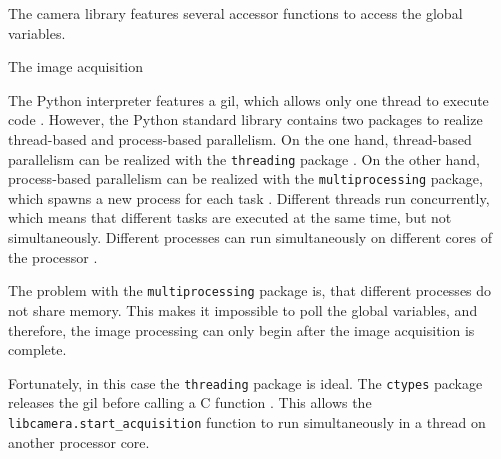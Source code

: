 The camera library features several accessor functions to access the global variables.



The image acquisition 


The Python interpreter features a \acrfull{gil}, which allows only one thread to execute code \cite{}. %
However, the Python standard library contains two packages to realize thread-based and process-based parallelism.
On the one hand, thread-based parallelism can be realized with the \texttt{threading} package \cite{}. %
On the other hand, process-based parallelism can be realized with the \texttt{multiprocessing} package, which spawns a new process for each task \cite{}. %
Different threads run concurrently, which means that different tasks are executed at the same time, but not simultaneously.
Different processes can run simultaneously on different cores of the processor \cite{}. %

The problem with the \texttt{multiprocessing} package is, that different processes do not share memory.
This makes it impossible to poll the global variables, and therefore, the image processing can only begin after the image acquisition is complete.

Fortunately, in this case the \texttt{threading} package is ideal.
The \texttt{ctypes} package releases the \acrshort{gil} before calling a C function \cite{}. %
This allows the \texttt{libcamera.start\_acquisition} function to run simultaneously in a thread on another processor core.

